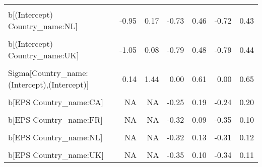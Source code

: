 \begin{table}
\begin{tabular}[t]{lrrrrrr}
\cellcolor{gray!10}{b[(Intercept) Country\_name:IL]} & \cellcolor{gray!10}{-1.34} & \cellcolor{gray!10}{1.07} & \cellcolor{gray!10}{-0.74} & \cellcolor{gray!10}{0.60} & \cellcolor{gray!10}{-0.76} & \cellcolor{gray!10}{0.65}\\
b[(Intercept) Country\_name:NL] & -0.95 & 0.17 & -0.73 & 0.46 & -0.72 & 0.43\\
\cellcolor{gray!10}{b[(Intercept) Country\_name:SE]} & \cellcolor{gray!10}{0.44} & \cellcolor{gray!10}{1.61} & \cellcolor{gray!10}{-0.39} & \cellcolor{gray!10}{1.05} & \cellcolor{gray!10}{-0.39} & \cellcolor{gray!10}{1.09}\\
b[(Intercept) Country\_name:UK] & -1.05 & 0.08 & -0.79 & 0.48 & -0.79 & 0.44\\
\cellcolor{gray!10}{b[(Intercept) Country\_name:US]} & \cellcolor{gray!10}{-0.05} & \cellcolor{gray!10}{1.06} & \cellcolor{gray!10}{-0.36} & \cellcolor{gray!10}{0.78} & \cellcolor{gray!10}{-0.36} & \cellcolor{gray!10}{0.83}\\
Sigma[Country\_name:(Intercept),(Intercept)] & 0.14 & 1.44 & 0.00 & 0.61 & 0.00 & 0.65\\
\cellcolor{gray!10}{b[EPS Country\_name:BE]} & \cellcolor{gray!10}{NA} & \cellcolor{gray!10}{NA} & \cellcolor{gray!10}{-0.34} & \cellcolor{gray!10}{0.12} & \cellcolor{gray!10}{-0.32} & \cellcolor{gray!10}{0.14}\\
b[EPS Country\_name:CA] & NA & NA & -0.25 & 0.19 & -0.24 & 0.20\\
\cellcolor{gray!10}{b[EPS Country\_name:CH]} & \cellcolor{gray!10}{NA} & \cellcolor{gray!10}{NA} & \cellcolor{gray!10}{-0.13} & \cellcolor{gray!10}{0.29} & \cellcolor{gray!10}{-0.13} & \cellcolor{gray!10}{0.28}\\
b[EPS Country\_name:FR] & NA & NA & -0.32 & 0.09 & -0.35 & 0.10\\
\cellcolor{gray!10}{b[EPS Country\_name:IL]} & \cellcolor{gray!10}{NA} & \cellcolor{gray!10}{NA} & \cellcolor{gray!10}{-0.39} & \cellcolor{gray!10}{0.37} & \cellcolor{gray!10}{-0.43} & \cellcolor{gray!10}{0.40}\\
b[EPS Country\_name:NL] & NA & NA & -0.32 & 0.13 & -0.31 & 0.12\\
\cellcolor{gray!10}{b[EPS Country\_name:SE]} & \cellcolor{gray!10}{NA} & \cellcolor{gray!10}{NA} & \cellcolor{gray!10}{-0.01} & \cellcolor{gray!10}{0.45} & \cellcolor{gray!10}{-0.02} & \cellcolor{gray!10}{0.44}\\
b[EPS Country\_name:UK] & NA & NA & -0.35 & 0.10 & -0.34 & 0.11\\

\end{tabular}
\end{table}
